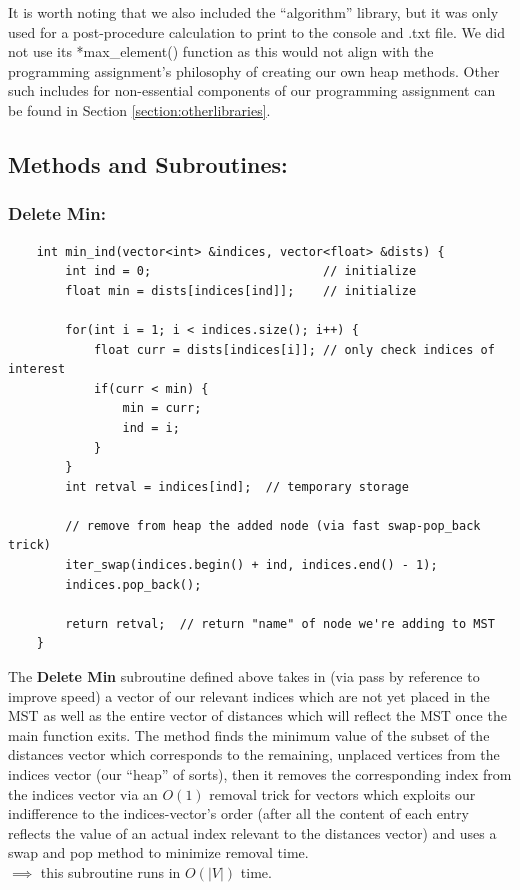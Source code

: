 \documentclass[conference]{styles/acmsiggraph}
\newcommand{\?}{\stackrel{?}{=}}
\begin{document}
It is worth noting that we also included the \enquote{algorithm} library, but it was only used for a post-procedure calculation to print to the console and .txt file.  We did not use its *max\_element() function as this would not align with the programming assignment's philosophy of creating our own heap methods.  Other such includes for non-essential components of our programming assignment can be  found in Section \ref{section:otherlibraries}.

\subsection{Methods and Subroutines:}
\subsubsection{Delete Min:}
\begin{verbatim}
    int min_ind(vector<int> &indices, vector<float> &dists) {
        int ind = 0;                        // initialize
        float min = dists[indices[ind]];    // initialize
        
        for(int i = 1; i < indices.size(); i++) {
            float curr = dists[indices[i]]; // only check indices of interest
            if(curr < min) {
                min = curr;
                ind = i;
            }
        }
        int retval = indices[ind];  // temporary storage
        
        // remove from heap the added node (via fast swap-pop_back trick)
        iter_swap(indices.begin() + ind, indices.end() - 1);
        indices.pop_back();
     
        return retval;  // return "name" of node we're adding to MST
    }
\end{verbatim}
The \textbf{Delete Min} subroutine defined above takes in (via pass by reference to improve speed) a vector of our relevant indices which are not yet placed in the MST as well as the entire vector of distances which will reflect the MST once the main function exits.  The method finds the minimum value of the subset of the distances vector which corresponds to the remaining, unplaced vertices from the indices vector (our \enquote{heap} of sorts), then it removes the corresponding index from the indices vector via an $O(1)$ removal trick for vectors which exploits our indifference to the indices-vector's order (after all the content of each entry reflects the value of an actual index relevant to the distances vector) and uses a swap and pop method to minimize removal time. \\
$\implies$ this subroutine runs in $O(|V|)$ time.
\end{document}
